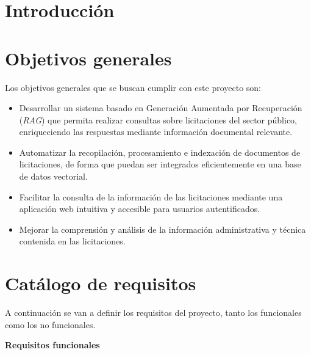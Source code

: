 
\section{Introducción}



\section{Objetivos generales}

Los objetivos generales que se buscan cumplir con este proyecto son:
\begin{itemize}
\tightlist
	\item Desarrollar un sistema basado en Generación Aumentada por Recuperación (\textit{RAG}) que permita realizar consultas sobre licitaciones del sector público, enriqueciendo las respuestas mediante información documental relevante.
	\item Automatizar la recopilación, procesamiento e indexación de documentos de licitaciones, de forma que puedan ser integrados eficientemente en una base de datos vectorial.
	\item Facilitar la consulta de la información de las licitaciones mediante una aplicación web intuitiva y accesible para usuarios autentificados.
	\item Mejorar la comprensión y análisis de la información administrativa y técnica contenida en las licitaciones.
\end{itemize}

\section{Catálogo de requisitos}

A continuación se van a definir los requisitos del proyecto, tanto los funcionales como los no funcionales.

\textbf{Requisitos funcionales}

